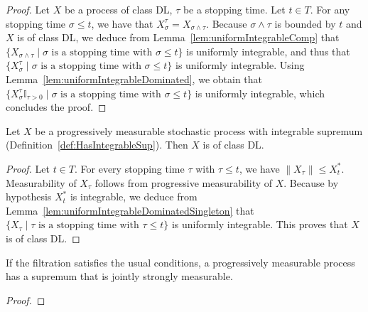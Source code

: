 \begin{proof}\leanok
Let $X$ be a process of class DL, $\tau$ be a stopping time. Let $t \in T$. For any stopping time $\sigma \le t$, we have that $X_\sigma^\tau = X_{\sigma \land \tau}$. Because $\sigma \land \tau$ is bounded by $t$ and $X$ is of class DL, we deduce from Lemma~\ref{lem:uniformIntegrableComp} that $\{X_{\sigma \land \tau} \mid \sigma \text{ is a stopping time with } \sigma \le t\}$ is uniformly integrable, and thus that $\{X^\tau_\sigma \mid \sigma \text{ is a stopping time with } \sigma \le t\}$ is uniformly integrable. Using Lemma~\ref{lem:uniformIntegrableDominated}, we obtain that $\{X^\tau_\sigma \mathbb{I}_{\tau > 0} \mid \sigma \text{ is a stopping time with } \sigma \le t\}$ is uniformly integrable, which concludes the proof.
\end{proof}


\begin{lemma}\label{lem:Integrable.classDL}
  \leanok
Let $X$ be a progressively measurable stochastic process with integrable supremum (Definition~\ref{def:HasIntegrableSup}). Then $X$ is of class DL.
\end{lemma}

\begin{proof}\leanok
Let $t \in T$. For every stopping time $\tau$ with $\tau \le t$, we have $\|X_\tau\| \le X^*_t$.
Measurability of $X_\tau$ follows from progressive measurability of $X$.
Because by hypothesis $X^*_t$ is integrable, we deduce from Lemma~\ref{lem:uniformIntegrableDominatedSingleton} that $\{X_\tau \mid \tau \text{ is a stopping time with } \tau \le t\}$ is uniformly integrable.
This proves that $X$ is of class DL.
\end{proof}


\begin{lemma}\label{lem:IsStronglyProgressive.hasStronglyMeasurableSup}
  \leanok
  If the filtration satisfies the usual conditions, a progressively measurable process has a supremum that is jointly strongly measurable.
\end{lemma}

\begin{proof}\leanok

\end{proof}

